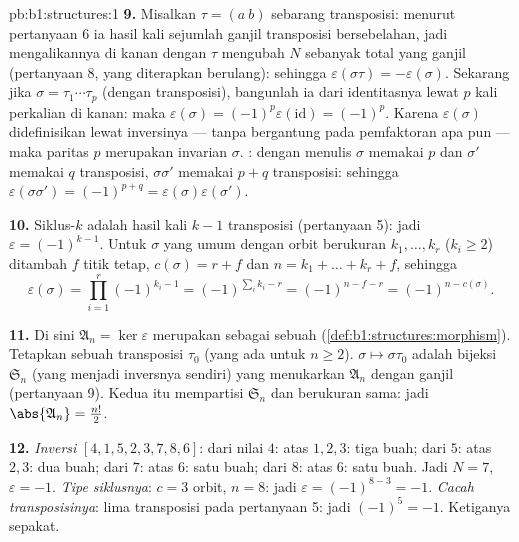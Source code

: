 \begin{solution}{pb:b1:structures:1}
\textbf{9.} Misalkan $\tau = (a\ b)$ sebarang transposisi: menurut
pertanyaan 6 ia hasil kali sejumlah ganjil transposisi
bersebelahan, jadi mengalikannya di kanan dengan $\tau$ mengubah $N$ sebanyak
total yang ganjil (pertanyaan 8, yang diterapkan berulang): sehingga $\varepsilon(\sigma
\tau) = -\varepsilon(\sigma)$. Sekarang jika $\sigma = \tau_1\cdots
\tau_p$ (dengan transposisi), bangunlah ia dari identitasnya lewat $p$ kali
perkalian di kanan: maka $\varepsilon(\sigma) =
(-1)^p\varepsilon(\mathrm{id}) = (-1)^p$. Karena
$\varepsilon(\sigma)$ didefinisikan lewat inversinya --- tanpa bergantung
pada pemfaktoran apa pun --- maka paritas $p$ merupakan invarian
$\sigma$. : dengan menulis $\sigma$ memakai $p$ dan $\sigma'$ memakai
$q$ transposisi, $\sigma\sigma'$ memakai $p + q$ transposisi:
sehingga $\varepsilon(\sigma\sigma') = (-1)^{p+q} =
\varepsilon(\sigma)\varepsilon(\sigma')$.

\textbf{10.} Siklus-$k$ adalah hasil kali $k - 1$ transposisi
(pertanyaan 5): jadi $\varepsilon = (-1)^{k-1}$. Untuk $\sigma$ yang umum
dengan orbit berukuran $k_1, \dots, k_r$ ($k_i \geq 2$) ditambah $f$
titik tetap, $c(\sigma) = r + f$ dan $n = k_1 + \dots + k_r + f$,
sehingga
\[
\varepsilon(\sigma) = \prod_{i=1}^r (-1)^{k_i - 1}
= (-1)^{\sum_i k_i - r} = (-1)^{n - f - r} = (-1)^{n -
c(\sigma)} .
\]

\textbf{11.} Di sini $\mathfrak A_n = \ker\varepsilon$ merupakan  sebagai
 sebuah  (\cref{def:b1:structures:morphism}). Tetapkan
sebuah transposisi $\tau_0$ (yang ada untuk $n \geq 2$).  $\sigma
\mapsto \sigma\tau_0$ adalah bijeksi $\mathfrak S_n$ (yang menjadi inversnya
sendiri) yang menukarkan $\mathfrak A_n$ dengan  
ganjil (pertanyaan 9). Kedua  itu mempartisi $\mathfrak S_n$
dan berukuran sama: jadi $\abs{\mathfrak A_n} = \frac{n!}2$.

\textbf{12.} \emph{Inversi} $[4, 1, 5, 2, 3, 7, 8, 6]$: dari
nilai $4$: atas $1, 2, 3$: tiga buah; dari $5$: atas $2, 3$: dua buah;
dari $7$: atas $6$: satu buah; dari $8$: atas $6$: satu buah. Jadi $N = 7$,
$\varepsilon = -1$. \emph{Tipe siklusnya}: $c = 3$ orbit, $n = 8$:
jadi $\varepsilon = (-1)^{8-3} = -1$. \emph{Cacah transposisinya}: lima
transposisi pada pertanyaan 5: jadi $(-1)^5 = -1$. Ketiganya sepakat.


\end{solution}
